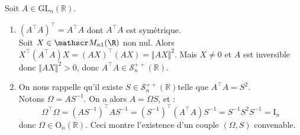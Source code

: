 Soit $A \in \mathrm{G L}_n(\mathbb{R})$.
\begin{enumerate}
\item $(A^\top A)^\top=A^\top A$ dont $A^\top A$ est symétrique.\\
Soit $X\in\mathscr M_{n1}(\R)$ non nul. Alors $X^\top(A^\top A)X=(AX)^\top(AX)=\Vert AX\Vert^2$. Mais $X\neq 0$ et $A$ est inversible donc $\Vert AX\Vert^2>0$, donc $A^\top A\in\mathscr S_n^{++}(\mathbb R)$.
\item On nous rappelle qu'il existe $S \in \mathscr S_n^{++}(\mathbb R)$telle que $A^\top A=S^2$.\\
Notons $\Omega=A S^{-1}$. On a alors $A=\Omega S$, et :
$$\Omega^\top \Omega=\left(A S^{-1}\right)^\top A S^{-1}=(S^{-1})^\top\left(A^\top A\right) S^{-1}=S^{-1} S^2 S^{-1}=\mathrm{I}_n$$
donc $\Omega \in \mathrm{O}_n(\mathbb{R})$. Ceci montre l'existence d'un couple $(\Omega, S)$ convenable.
\end{enumerate}
